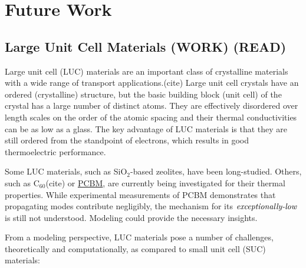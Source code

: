 \section{\label{Future}Future Work}

\subsection{\label{Future:LUC}Large Unit Cell Materials (WORK) (READ)}

Large unit cell (LUC) materials are an important class of crystalline 
materials with a wide range of transport applications.(cite) 
Large unit cell crystals have an ordered (crystalline) structure, but 
the basic building block (unit cell) of the crystal has a large number 
of distinct atoms. 
They are effectively disordered 
over length scales on the order of the atomic spacing and their thermal 
conductivities can be as low as a glass.\cite{cahill_lower_1992} 
The key advantage of LUC materials is that they are still ordered 
from the standpoint of electrons, which results in good thermoelectric 
performance.
\cite{he_thermoelectric_2006,yang_effect_2006,wang_thermoelectric_2007} 

Some LUC 
materials, such as SiO$_2$-based zeolites, have been 
long-studied. Others, such as C$_60$(cite) or 
\href{http://en.wikipedia.org/wiki/Phenyl-C61-butyric_acid_methyl_ester}
{PCBM}, are currently being investigated for their thermal properties.
\cite{duda_exceptionally_2013} 
While experimental measurements of PCBM demonstrates that propagating 
modes contribute negligibly, the mechanism for its 
$\emph{exceptionally-low}$ is still not understood. Modeling could 
provide the necessary insights. 

From a modeling perspective, LUC materials pose a number of challenges,
theoretically and computationally, as compared to small unit cell 
(SUC) materials:

